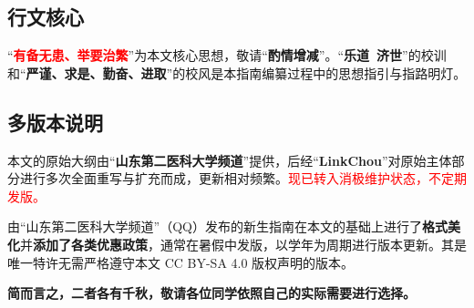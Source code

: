 \subsection[行文核心]{行文核心}
“\textcolor{red}{\textbf{有备无患、举要治繁}}”为本文核心思想，敬请“\textbf{酌情增减}”。“\textbf{乐道\ 济世}”的校训和“\textbf{严谨、求是、勤奋、进取}”的校风是本指南编纂过程中的思想指引与指路明灯。

\subsection[多版本说明]{多版本说明}
本文的原始大纲由“\textbf{山东第二医科大学频道}”提供，后经“\textbf{LinkChou}”对原始主体部分进行多次全面重写与扩充而成，更新相对频繁。\textcolor{red}{现已转入消极维护状态，不定期发版。}

由“山东第二医科大学频道”（QQ）发布的新生指南在本文的基础上进行了\textbf{格式美化}并\textbf{添加了各类优惠政策}，通常在暑假中发版，以学年为周期进行版本更新。其是唯一特许无需严格遵守本文 CC BY-SA 4.0 版权声明的版本。

\textbf{简而言之，二者各有千秋，敬请各位同学依照自己的实际需要进行选择。}
